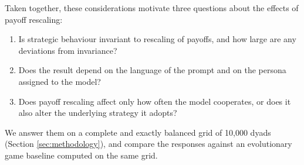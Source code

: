 \documentclass[11pt,a4paper]{article}
\begin{document}



Taken together, these considerations motivate three questions about the effects of payoff rescaling:
\begin{enumerate}[(1)]
\item Is strategic behaviour invariant to   rescaling of payoffs, and how large are any deviations from invariance?
\item Does the result depend on the language of the prompt and on the persona assigned to the model?

\item Does payoff rescaling affect only how often the model  cooperates, or does it also alter the underlying strategy it adopts?

\end{enumerate}
We answer them on a complete and exactly balanced grid of 10{,}000 dyads
(Section \ref{sec:methodology}), and compare the responses against an evolutionary game
baseline computed on the same grid.
\end{document}
